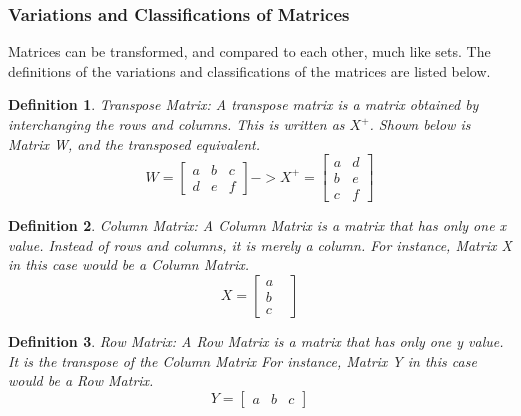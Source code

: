 \documentclass[final,1p,12pt]{elsarticle}
\newtheorem{definition}{Definition}
\begin{document}
        \subsubsection{Variations and Classifications of Matrices}
        Matrices can be transformed, and compared to each other, much like sets. The definitions of the variations and classifications of the matrices are listed below.
        
        \begin{definition}Transpose Matrix: 
            A transpose matrix is a matrix obtained by interchanging the rows and columns. This is written as $X^{+}$. Shown below is Matrix W, and the transposed equivalent.
            \begin{equation*}
                W =
                \begin{bmatrix}
                    a & b & c \\
                    d & e & f
                \end{bmatrix}
                -> X^{+} =
                \begin{bmatrix}
                    a & d \\
                    b & e \\
                    c & f
                \end{bmatrix}
            \end{equation*}
        \end{definition}
        
        \begin{definition}Column Matrix:
        A Column Matrix is a matrix that has only one x value. Instead of rows and columns, it is merely a column. For instance, Matrix X in this case would be a Column Matrix.
        \begin{equation*}%
            X =
            \begin{bmatrix}
                a&\\
                b&\\
                c
            \end{bmatrix}
        \end{equation*}
        \end{definition}
        
        \begin{definition}Row Matrix:
        A Row Matrix is a matrix that has only one y value. It is the transpose of the Column Matrix For instance, Matrix Y in this case would be a Row Matrix.
        \begin{equation*}%
            Y =
            \begin{bmatrix}
                a & b & c
            \end{bmatrix}
        \end{equation*}
        \end{definition}
        
\end{document}
